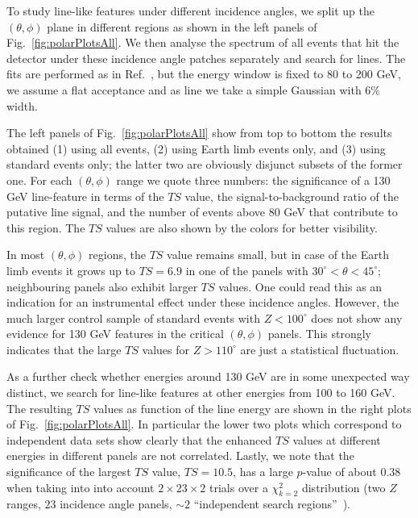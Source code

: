 \documentclass[aps,twocolumn,prd,superscriptaddress,showpacs,nofootinbib,fixfloat]{revtex4}
\begin{document}
To study line-like features under different incidence angles, we split up the
$(\theta, \phi)$ plane in different regions as shown in the left panels of
Fig.~\ref{fig:polarPlotsAll}. We then analyse the spectrum of all events that
hit the detector under these incidence angle patches separately and search for
lines. The fits are performed as in Ref.~\cite{Weniger:2012}, but the energy
window is fixed to 80 to 200 GeV, we assume a flat acceptance and as line we
take a simple Gaussian with $6\%$ width.

The left panels of Fig.~\ref{fig:polarPlotsAll} show from top to bottom the
results obtained (1) using all events, (2) using Earth limb events only, and
(3) using standard events only; the latter two are obviously disjunct subsets
of the former one. For each $(\theta, \phi)$ range we quote three numbers: the
significance of a 130 GeV line-feature in terms of the $TS$ value, the
signal-to-background ratio of the putative line signal, and the number of
events above 80 GeV that contribute to this region. The $TS$
values are also shown by the colors for better visibility.

In most $(\theta,\phi)$ regions, the $TS$ value remains small, but in case of
the Earth limb events it grows up to $TS=6.9$ in one of the panels with
$30^\circ<\theta<45^\circ$; neighbouring panels also exhibit larger $TS$
values. One could read this as an indication for an instrumental effect under
these incidence angles. However, the much larger control sample of standard
events with $Z<100^\circ$ does not show any evidence for 130 GeV features in
the critical $(\theta, \phi)$ panels. This strongly indicates that the large
$TS$ values for $Z>110^\circ$ are just a statistical fluctuation. 


As a further check whether energies around 130 GeV are in some unexpected way
distinct, we search for line-like features at other energies from 100 to 160
GeV. The resulting $TS$ values as function of the line energy are shown in the
right plots of Fig.~\ref{fig:polarPlotsAll}. In particular the lower two plots
which correspond to independent data sets show clearly that the enhanced $TS$
values at different energies in different panels are not correlated. Lastly,
we note that the significance of the largest $TS$ value, $TS=10.5$, has a
large $p$-value of about $0.38$ when taking into into account
$2\times23\times2$ trials over a $\chi_{k=2}^2$ distribution (two $Z$ ranges,
$23$ incidence angle panels, $\sim2$ ``independent search
regions''~\cite{Vittels}).
\end{document}

